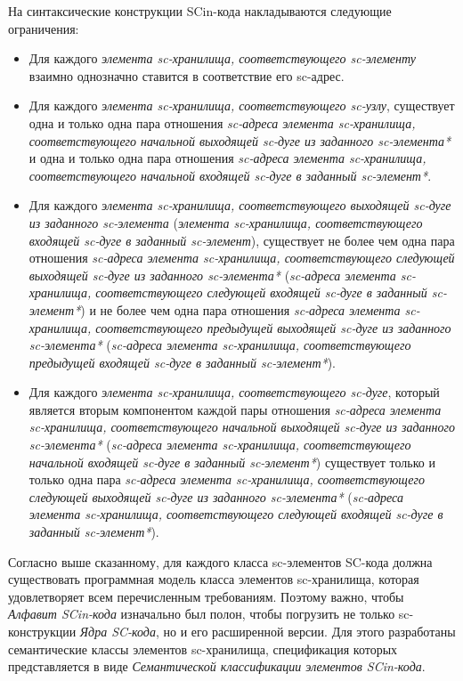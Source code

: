 На синтаксические конструкции SCin-кода накладываются следующие ограничения:
\begin{itemize}
    \item Для каждого \textit{элемента sc-хранилища, соответствующего sc-элементу} взаимно однозначно ставится в соответствие его sc-адрес.
    \item Для каждого \textit{элемента sc-хранилища, соответствующего sc-узлу}, существует одна и только одна пара отношения \textit{sc-адреса элемента sc-хранилища, соответствующего начальной выходящей sc-дуге из заданного sc-элемента*} и одна и только одна пара отношения \textit{sc-адреса элемента sc-хранилища, соответствующего начальной входящей sc-дуге в заданный sc-элемент*}.
    \item Для каждого \textit{элемента sc-хранилища, соответствующего выходящей sc-дуге из заданного sc-элемента} (\textit{элемента sc-хранилища, соответствующего входящей sc-дуге в заданный sc-элемент}), существует не более чем одна пара отношения \textit{sc-адреса элемента sc-хранилища, соответствующего следующей выходящей sc-дуге из заданного sc-элемента*} (\textit{sc-адреса элемента sc-хранилища, соответствующего следующей входящей sc-дуге в заданный sc-элемент*}) и не более чем одна пара отношения \textit{sc-адреса элемента sc-хранилища, соответствующего предыдущей выходящей sc-дуге из заданного sc-элемента*} (\textit{sc-адреса элемента sc-хранилища, соответствующего предыдущей входящей sc-дуге в заданный sc-элемент*}).
    \item Для каждого \textit{элемента sc-хранилища, соответствующего sc-дуге}, который является вторым компонентом каждой пары отношения \textit{sc-адреса элемента sc-хранилища, соответствующего начальной выходящей sc-дуге из заданного sc-элемента*} (\textit{sc-адреса элемента sc-хранилища, соответствующего начальной входящей sc-дуге в заданный sc-элемент*}) существует только и только одна пара \textit{sc-адреса элемента sc-хранилища, соответствующего следующей выходящей sc-дуге из заданного sc-элемента*} (\textit{sc-адреса элемента sc-хранилища, соответствующего следующей входящей sc-дуге в заданный sc-элемент*}).
\end{itemize}

Согласно выше сказанному, для каждого класса sc-элементов SC-кода должна существовать программная модель класса элементов sc-хранилища, которая удовлетворяет всем перечисленным требованиям. Поэтому важно, чтобы \textit{Алфавит SCin-кода} изначально был полон, чтобы погрузить не только sc-конструкции \textit{Ядра SC-кода}, но и его расширенной версии. Для этого разработаны семантические классы элементов sc-хранилища, спецификация которых представляется в виде \textit{Семантической классификации элементов SCin-кода}.

